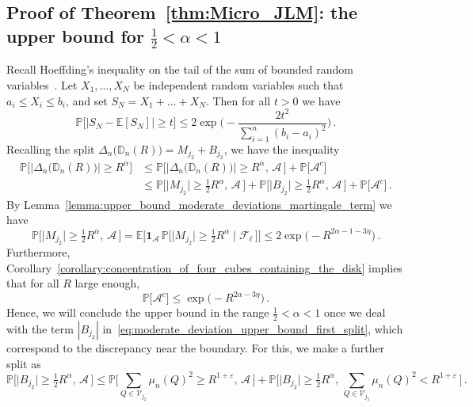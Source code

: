 \documentclass[11pt]{amsart}
\theoremstyle{definition}
\theoremstyle{remark}
\numberwithin{equation}{section}
\def\eps{{\varepsilon}}
\newcommand{\bD}{\mathbb D}
\newcommand{\bP}{\mathbb P}
\newcommand{\bE}{\mathbb E}
\begin{document}
	\subsection{Proof of Theorem~\ref{thm:Micro_JLM}: the upper bound for \texorpdfstring{$\frac{1}{2}<\alpha<1$}{1/2 < alpha < 1}}
	\label{sec:proof_thm_upper_bound_moderate}
	Recall Hoeffding's inequality on the tail of the sum of bounded random variables~\cite{Hoeffding}. Let $X_1,\ldots,X_N$ be independent random variables such that $a_i\le X_i \le b_i$, and set $S_N = X_1 + \ldots+ X_N$. Then for all $t> 0$ we have
	\begin{equation}
		\label{eq:Hoeffding_ineq}
		\bP\Big[\big|S_N - \bE[S_N]\big| \ge t\Big] \le 2\exp\bigg(-\frac{2t^2}{\sum_{i=1}^{n}(b_i-a_i)^2}\bigg) \, .
	\end{equation}
	Recalling the split $\Delta_n\big(\bD_n(R)\big) = M_{j_2} + B_{j_2}$, we have the inequality
	\begin{align}
		\nonumber
		\label{eq:moderate_deviation_upper_bound_first_split}
		\bP\Big[\big|\Delta_n\big(\bD_n(R)\big) \big| \ge R^{\alpha}\Big] &\le \bP\Big[\big|\Delta_n\big(\bD_n(R)\big) \big| \ge R^{\alpha}, \, \mathcal{A} \, \Big] + \bP\big[\mathcal{A}^c\big] \\ &\le \bP\Big[\big|M_{j_2} \big| \ge \tfrac{1}{2}R^{\alpha}, \, \mathcal{A} \, \Big] + \bP\Big[\big|B_{j_2} \big| \ge \tfrac{1}{2}R^{\alpha}, \, \mathcal{A} \, \Big] + \bP\big[\mathcal{A}^c\big] \, .
	\end{align}
	By Lemma~\ref{lemma:upper_bound_moderate_deviations_martingale_term} we have
	\[
	\bP\Big[\big|M_{j_2} \big| \ge \tfrac{1}{2}R^{\alpha}, \, \mathcal{A} \, \Big] = \bE\Big[\mathbf{1}_{\mathcal{A}} \, \bP\Big[\big|M_{j_2} \big| \ge \tfrac{1}{2}R^{\alpha} \mid \mathcal{F}_\ell \, \Big]\Big] \le 2\exp\Big(-R^{2\alpha -1 - 3\eta}\Big) \, .
	\]
	Furthermore, Corollary~\ref{corollary:concentration_of_four_cubes_containing_the_disk} implies that for all $R$ large enough,
	\[
	\bP\big[\mathcal{A}^c\big] \le \exp\Big(-R^{2\alpha- 3\eta}\Big) \, .
	\]
	Hence, we will conclude the upper bound in the range $\frac{1}{2}< \alpha<1$ once we deal with the term $|B_{j_2}|$ in~\eqref{eq:moderate_deviation_upper_bound_first_split}, which correspond to the discrepancy near the boundary. For this, we make a further split as
	\begin{equation*}
		\bP\Big[\big|B_{j_2} \big| \ge \tfrac{1}{2}R^{\alpha}, \, \mathcal{A} \, \Big]  \le \bP\Big[\sum_{Q\in \mathcal{V}_{j_2}} \mu_n(Q)^2 \ge R^{1+\eps} , \, \mathcal{A} \, \Big] + \bP\Big[\big|B_{j_2} \big| \ge \tfrac{1}{2}R^{\alpha}, \, \sum_{Q\in \mathcal{V}_{j_2}} \mu_n(Q)^2 < R^{1+\eps} \, \Big]\, .
	\end{equation*} 
\end{document}
